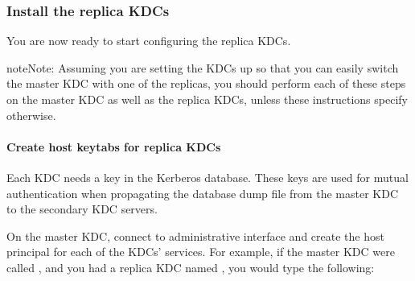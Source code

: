 \documentclass[letterpaper,10pt,english]{sphinxmanual}
\begin{document}
\subsubsection{Install the replica KDCs}
\label{\detokenize{admin/install_kdc:install-the-replica-kdcs}}
You are now ready to start configuring the replica KDCs.

\begin{sphinxadmonition}{note}{Note:}
Assuming you are setting the KDCs up so that you can easily
switch the master KDC with one of the replicas, you should
perform each of these steps on the master KDC as well as the
replica KDCs, unless these instructions specify otherwise.
\end{sphinxadmonition}


\paragraph{Create host keytabs for replica KDCs}
\label{\detokenize{admin/install_kdc:create-host-keytabs-for-replica-kdcs}}\label{\detokenize{admin/install_kdc:replica-host-key}}
Each KDC needs a  key in the Kerberos database.  These keys
are used for mutual authentication when propagating the database dump
file from the master KDC to the secondary KDC servers.

On the master KDC, connect to administrative interface and create the
host principal for each of the KDCs’  services.  For example,
if the master KDC were called , and you had a
replica KDC named , you would type the
following:

%
\begin{sphinxVerbatim}[commandchars=\\\{\}]
 
   
      
  

   
      
  
\end{sphinxVerbatim}
\end{document}
